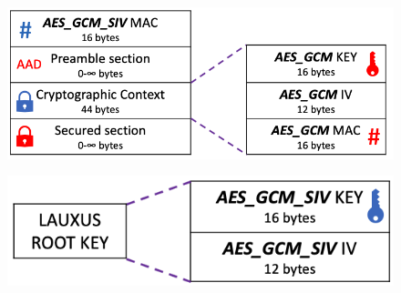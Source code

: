 \documentclass[../main.tex]{subfiles}
\begin{document}
\begin{figure}[ht]
    \centering
    \begin{minipage}{.5\textwidth}
        \centering
        \includegraphics[width=.9\linewidth]{images/lauxus/metadata_encryption}
        \label{figure:lauxus:metadate_encryption}
    \end{minipage}%
    \begin{minipage}{.5\textwidth}
        \centering
        \includegraphics[width=.9\linewidth]{images/lauxus/root_key}
        \label{figure:lauxus:root_key}
    \end{minipage}
\end{figure}
\end{document}
